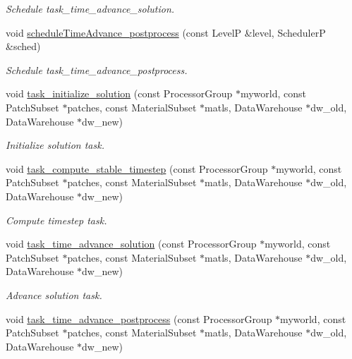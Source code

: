 \begin{DoxyCompactItemize}
\begin{DoxyCompactList}\small\item\em Schedule task\+\_\+time\+\_\+advance\+\_\+solution. \end{DoxyCompactList}\item 
void \hyperlink{classUintah_1_1PhaseField_1_1Benchmark01_ae448ca51efff33aa178ea1b8c4b54143}{schedule\+Time\+Advance\+\_\+postprocess} (const LevelP \&level, SchedulerP \&sched)
\begin{DoxyCompactList}\small\item\em Schedule task\+\_\+time\+\_\+advance\+\_\+postprocess. \end{DoxyCompactList}\item 
void \hyperlink{classUintah_1_1PhaseField_1_1Benchmark01_a1e484a56215a850e343c3c739967363a}{task\+\_\+initialize\+\_\+solution} (const Processor\+Group $\ast$myworld, const Patch\+Subset $\ast$patches, const Material\+Subset $\ast$matls, Data\+Warehouse $\ast$dw\+\_\+old, Data\+Warehouse $\ast$dw\+\_\+new)
\begin{DoxyCompactList}\small\item\em Initialize solution task. \end{DoxyCompactList}\item 
void \hyperlink{classUintah_1_1PhaseField_1_1Benchmark01_aae2f068c2c47ba30085ab056c017eee3}{task\+\_\+compute\+\_\+stable\+\_\+timestep} (const Processor\+Group $\ast$myworld, const Patch\+Subset $\ast$patches, const Material\+Subset $\ast$matls, Data\+Warehouse $\ast$dw\+\_\+old, Data\+Warehouse $\ast$dw\+\_\+new)
\begin{DoxyCompactList}\small\item\em Compute timestep task. \end{DoxyCompactList}\item 
void \hyperlink{classUintah_1_1PhaseField_1_1Benchmark01_acf3bb77103efadfb4ffc45f04a2fb5db}{task\+\_\+time\+\_\+advance\+\_\+solution} (const Processor\+Group $\ast$myworld, const Patch\+Subset $\ast$patches, const Material\+Subset $\ast$matls, Data\+Warehouse $\ast$dw\+\_\+old, Data\+Warehouse $\ast$dw\+\_\+new)
\begin{DoxyCompactList}\small\item\em Advance solution task. \end{DoxyCompactList}\item 
void \hyperlink{classUintah_1_1PhaseField_1_1Benchmark01_a96b43a37981c4a1fd842fc97d60e5234}{task\+\_\+time\+\_\+advance\+\_\+postprocess} (const Processor\+Group $\ast$myworld, const Patch\+Subset $\ast$patches, const Material\+Subset $\ast$matls, Data\+Warehouse $\ast$dw\+\_\+old, Data\+Warehouse $\ast$dw\+\_\+new)

\end{DoxyCompactItemize}
